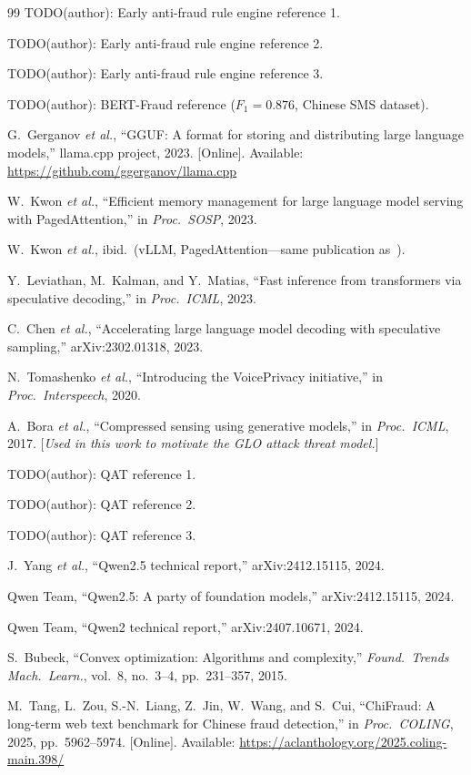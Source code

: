 \documentclass[lettersize,journal]{IEEEtran}
\begin{document}
\begin{thebibliography}{99}
TODO(author): Early anti-fraud rule engine reference 1.

TODO(author): Early anti-fraud rule engine reference 2.

TODO(author): Early anti-fraud rule engine reference 3.

TODO(author): BERT-Fraud reference ($F_1 = 0.876$, Chinese SMS dataset).

G.~Gerganov \textit{et al.}, ``GGUF: A format for storing and
distributing large language models,'' llama.cpp project, 2023.
[Online]. Available: \url{https://github.com/ggerganov/llama.cpp}

W.~Kwon \textit{et al.}, ``Efficient memory management for large
language model serving with PagedAttention,'' in \emph{Proc.\ SOSP},
2023.

W.~Kwon \textit{et al.}, ibid.\ (vLLM, PagedAttention---same
publication as~\cite{18}).

Y.~Leviathan, M.~Kalman, and Y.~Matias, ``Fast inference from
transformers via speculative decoding,'' in \emph{Proc.\ ICML}, 2023.

C.~Chen \textit{et al.}, ``Accelerating large language model decoding
with speculative sampling,'' arXiv:2302.01318, 2023.

N.~Tomashenko \textit{et al.}, ``Introducing the VoicePrivacy
initiative,'' in \emph{Proc.\ Interspeech}, 2020.

A.~Bora \textit{et al.}, ``Compressed sensing using generative
models,'' in \emph{Proc.\ ICML}, 2017. [\textit{Used in this work to
motivate the GLO attack threat model.}]

TODO(author): QAT reference 1.

TODO(author): QAT reference 2.

TODO(author): QAT reference 3.

J.~Yang \textit{et al.}, ``Qwen2.5 technical report,''
arXiv:2412.15115, 2024.

Qwen Team, ``Qwen2.5: A party of foundation models,''
arXiv:2412.15115, 2024.

Qwen Team, ``Qwen2 technical report,'' arXiv:2407.10671, 2024.

S.~Bubeck, ``Convex optimization: Algorithms and complexity,''
\emph{Found.\ Trends Mach.\ Learn.}, vol.~8, no.~3--4, pp.~231--357,
2015.

M.~Tang, L.~Zou, S.-N.~Liang, Z.~Jin, W.~Wang, and S.~Cui,
``ChiFraud: A long-term web text benchmark for Chinese fraud
detection,'' in \emph{Proc.\ COLING}, 2025, pp.~5962--5974.
[Online]. Available: \url{https://aclanthology.org/2025.coling-main.398/}

\end{thebibliography}
\end{document}
